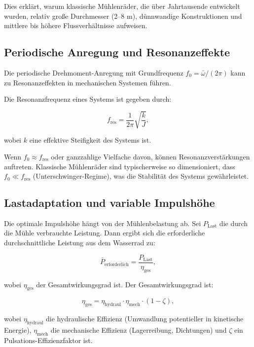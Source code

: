\documentclass[a4paper,12pt]{article}
\theoremstyle{definition}
\begin{document}
Dies erklärt, warum klassische Mühlenräder, die über Jahrtausende entwickelt wurden, relativ große Durchmesser (2--8 m), dünnwandige Konstruktionen und mittlere bis höhere Flussverhältnisse aufweisen.

\subsection{Periodische Anregung und Resonanzeffekte}

Die periodische Drehmoment-Anregung mit Grundfrequenz $f_0 = \bar{\omega}/(2\pi)$ kann zu Resonanzeffekten in mechanischen Systemen führen.

Die Resonanzfrequenz eines Systems ist gegeben durch:

\begin{equation}
  f_\text{res} = \frac{1}{2\pi}\sqrt{\frac{k}{J}},
  \label{eq:resonanz_freq}
\end{equation}

\noindent
wobei $k$ eine effektive Steifigkeit des Systems ist.

Wenn $f_0 \approx f_\text{res}$ oder ganzzahlige Vielfache davon, können Resonanzverstärkungen auftreten. Klassische Mühlenräder sind typischerweise so dimensioniert, dass $f_0 \ll f_\text{res}$ (Unterschwinger-Regime), was die Stabilität des Systems gewährleistet.

\subsection{Lastadaptation und variable Impulshöhe}

Die optimale Impulshöhe hängt von der Mühlenbelastung ab. Sei $P_\text{Last}$ die durch die Mühle verbrauchte Leistung. Dann ergibt sich die erforderliche durchschnittliche Leistung aus dem Wasserrad zu:

\begin{equation}
  \bar{P}_\text{erforderlich} = \frac{P_\text{Last}}{\eta_\text{ges}},
  \label{eq:p_erforderlich}
\end{equation}

\noindent
wobei $\eta_\text{ges}$ der Gesamtwirkungsgrad ist. Der Gesamtwirkungsgrad ist:

\begin{equation}
  \eta_\text{ges} = \eta_\text{hydraul} \cdot \eta_\text{mech} \cdot (1 - \zeta),
  \label{eq:eta_gesamt}
\end{equation}

\noindent
wobei $\eta_\text{hydraul}$ die hydraulische Effizienz (Umwandlung potentieller in kinetische Energie), $\eta_\text{mech}$ die mechanische Effizienz (Lagerreibung, Dichtungen) und $\zeta$ ein Pulsations-Effizienzfaktor ist.
\end{document}
